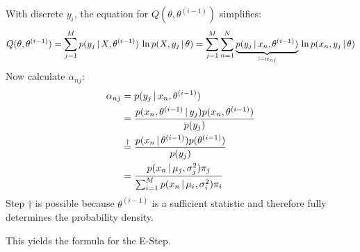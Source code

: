 					With discrete \(y_i\), the equation for \(Q(\theta, \theta^{(i - 1)})\) simplifies:
					\begin{equation}
						Q(\theta, \theta^{(i - 1)}) = \sum_{j = 1}^{M} p(y_j \,\vert\, X, \theta^{(i - 1)}) \, \ln p(X, y_j \,\vert\, \theta) = \sum_{j = 1}^{M} \sum_{n = 1}^{N} \underbrace{p(y_j \,\vert\, x_n, \theta^{(i - 1)})}_{\coloneqq \alpha_{nj}} \, \ln p(x_n, y_j \,\vert\, \theta)
					\end{equation}
					Now calculate \( \alpha_{nj} \):
					\begin{align}
						\alpha_{nj} & = p(y_j \,\vert\, x_n, \theta^{(i - 1)})                                                                  \\
						            & = \frac{p(x_n, \theta^{(i - 1)} \,\vert\, y_j) p(x_n, \theta^{(i - 1)})}{p(y_j)}                          \\
						            & \overset{\dagger}{=} \frac{p(x_n \,\vert\, \theta^{(i - 1)}) p(\theta^{(i - 1)})}{p(y_j)}                 \\
						            & = \frac{p(x_n \,\vert\, \mu_j, \sigma_j^2) \pi_j}{\sum_{i = 1}^{M} p(x_n \,\vert\, \mu_i, \sigma_i^2) \pi_i}
					\end{align}
					Step \(\dagger\) is possible because \( \theta^{(i - 1)} \) is a sufficient statistic and therefore fully determines the probability density.

					This yields the formula for the E-Step.

